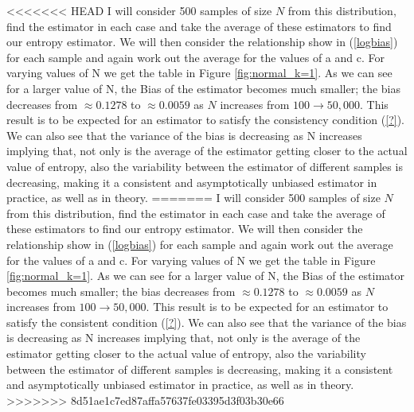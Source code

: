 \documentclass{article}
\begin{document}
<<<<<<< HEAD
I will consider 500 samples of size $N$ from this distribution, find the estimator in each case and take the average of these estimators to find our entropy estimator. We will then consider the relationship show in (\ref{logbias}) for each sample and again work out the average for the values of a and c. For varying values of N we get the table in Figure \ref{fig:normal_k=1}. As we can see for a larger value of N, the Bias of the estimator becomes much smaller; the bias decreases from $\approx 0.1278$ to $\approx 0.0059$ as $N$ increases from $100 \to 50,000$. This result is to be expected for an estimator to satisfy the consistency condition (\ref{?}). We can also see that the variance of the bias is decreasing as N increases implying that, not only is the average of the estimator getting closer to the actual value of entropy,  also the variability between the estimator of different samples is decreasing, making it a consistent and asymptotically unbiased estimator in practice, as well as in theory.
=======
I will consider 500 samples of size $N$ from this distribution, find the estimator in each case and take the average of these estimators to find our entropy estimator. We will then consider the relationship show in (\ref{logbias}) for each sample and again work out the average for the values of a and c. For varying values of N we get the table in Figure \ref{fig:normal_k=1}. As we can see for a larger value of N, the Bias of the estimator becomes much smaller; the bias decreases from $\approx 0.1278$ to $\approx 0.0059$ as $N$ increases from $100 \to 50,000$. This result is to be expected for an estimator to satisfy the consistent condition (\ref{?}). We can also see that the variance of the bias is decreasing as N increases implying that, not only is the average of the estimator getting closer to the actual value of entropy,  also the variability between the estimator of different samples is decreasing, making it a consistent and asymptotically unbiased estimator in practice, as well as in theory.
>>>>>>> 8d51ae1c7ed87affa57637fe03395d3f03b30e66
\end{document}
